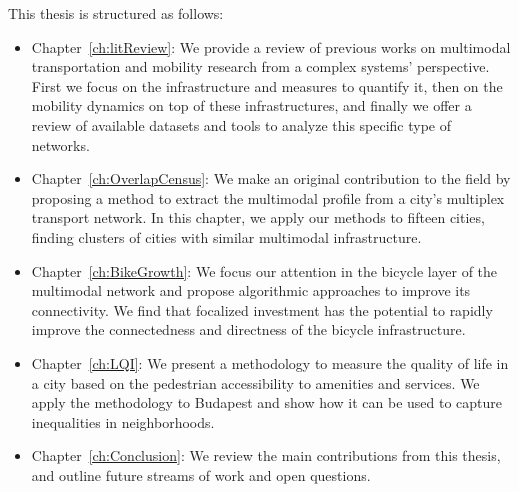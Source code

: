This thesis is structured as follows:

\begin{itemize}
    \item Chapter~\ref{ch:litReview}: We provide a review of previous works on multimodal transportation and mobility research from a complex systems' perspective. First we focus on the infrastructure and measures to quantify it, then on the mobility dynamics on top of these infrastructures, and finally we offer a review of available datasets and tools to analyze this specific type of networks.
    \item Chapter~\ref{ch:OverlapCensus}: We make an original contribution to the field by proposing a method to extract the multimodal profile from a city's multiplex transport network. In this chapter, we apply our methods to fifteen cities, finding clusters of cities with similar multimodal infrastructure.
    \item Chapter~\ref{ch:BikeGrowth}: We focus our attention in the bicycle layer of the multimodal network and propose algorithmic approaches to improve its connectivity. We find that focalized investment has the potential to rapidly improve the connectedness and directness of the bicycle infrastructure.
    \item Chapter~\ref{ch:LQI}: We present a methodology to measure the quality of life in a city based on the pedestrian accessibility to amenities and services. We apply the methodology to Budapest and show how it can be used to capture inequalities in neighborhoods. 
    \item Chapter~\ref{ch:Conclusion}: We review the main contributions from this thesis, and outline future streams of work and open questions. 
\end{itemize}






